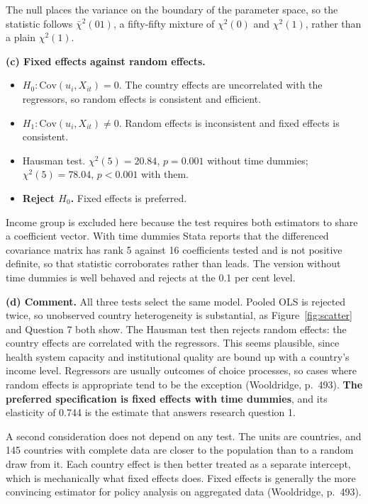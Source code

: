 \documentclass[11pt,a4paper]{article}
\begin{document}
The null places the variance on the boundary of the parameter space, so the
statistic follows $\bar\chi^2(01)$, a fifty-fifty mixture of $\chi^2(0)$ and
$\chi^2(1)$, rather than a plain $\chi^2(1)$.

\textbf{(c) Fixed effects against random effects.}

\begin{itemize}
  \item $H_0 : \mathrm{Cov}(u_i, X_{it}) = 0$. The country effects are
        uncorrelated with the regressors, so random effects is consistent and
        efficient.
  \item $H_1 : \mathrm{Cov}(u_i, X_{it}) \neq 0$. Random effects is inconsistent
        and fixed effects is consistent.
  \item Hausman test. $\chi^2(5) = 20.84$, $p = 0.001$ without time dummies;
        $\chi^2(5) = 78.04$, $p < 0.001$ with them.
  \item \textbf{Reject $H_0$.} Fixed effects is preferred.
\end{itemize}

Income group is excluded here because the test requires both estimators to
share a coefficient vector. With time dummies Stata reports that the differenced
covariance matrix has rank 5 against 16 coefficients tested and is not positive
definite, so that statistic corroborates rather than leads. The version without
time dummies is well behaved and rejects at the 0.1 per cent level.

\textbf{(d) Comment.} All three tests select the same model. Pooled OLS is
rejected twice, so unobserved country heterogeneity is substantial, as
Figure~\ref{fig:scatter} and Question 7 both show. The Hausman test then rejects
random effects: the country effects are correlated with the regressors. This
seems plausible, since health system capacity and institutional quality are
bound up with a country's income level. Regressors are usually outcomes of
choice processes, so cases where random effects is appropriate tend to be the
exception (Wooldridge, p.~493). \textbf{The preferred specification is fixed effects with time
dummies}, and its elasticity of 0.744 is the estimate that answers research
question 1.

A second consideration does not depend on any test. The units are countries,
and 145 countries with complete data are closer to the population than to a
random draw from it. Each country effect is then better treated as a separate
intercept, which is mechanically what fixed effects does. Fixed effects is
generally the more convincing estimator for policy analysis on aggregated data
(Wooldridge, p.~493).
\end{document}
